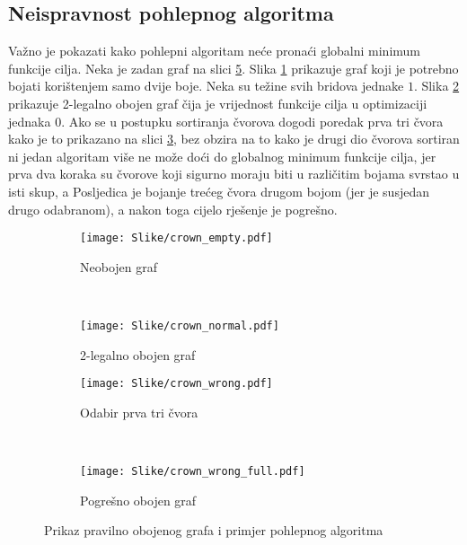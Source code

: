 \documentclass[times, utf8, diplomski, numeric]{fer}
\begin{document}
\subsection{Neispravnost pohlepnog algoritma}

Važno je pokazati kako pohlepni algoritam neće pronaći globalni minimum funkcije cilja. Neka je zadan graf na slici \ref{fig:greedy_alg}.
Slika \ref{fig:crown_empty} prikazuje graf koji je potrebno bojati korištenjem samo dvije boje. Neka su težine svih bridova jednake $1$. Slika \ref{fig:crown_normal} prikazuje 2-legalno obojen graf čija je vrijednost funkcije cilja u optimizaciji jednaka $0$. Ako se u postupku sortiranja čvorova dogodi poredak prva tri čvora kako je to prikazano na slici \ref{fig:crown_wrong}, bez obzira na to kako je drugi dio čvorova sortiran ni jedan algoritam više ne može doći do globalnog minimum funkcije cilja, jer prva dva koraka su čvorove koji sigurno moraju biti u različitim bojama svrstao u isti skup, a Posljedica je bojanje trećeg čvora drugom bojom (jer je susjedan drugo odabranom), a nakon toga cijelo rješenje je pogrešno.


\begin{figure}
        \centering
        \begin{subfigure}[b]{0.33\textwidth}
                \texttt{[image: Slike/crown\_empty.pdf]}
                \caption{Neobojen graf}
                \label{fig:crown_empty}
        \end{subfigure}
        ~
        \begin{subfigure}[b]{0.33\textwidth}
                \texttt{[image: Slike/crown\_normal.pdf]}
                \caption{2-legalno obojen graf}
                \label{fig:crown_normal}
        \end{subfigure}
         
        \begin{subfigure}[b]{0.33\textwidth}
                \texttt{[image: Slike/crown\_wrong.pdf]}
                \caption{Odabir prva tri čvora}
                \label{fig:crown_wrong}
        \end{subfigure}
        ~
        \begin{subfigure}[b]{0.33\textwidth}
                \texttt{[image: Slike/crown\_wrong\_full.pdf]}
                \caption{Pogrešno obojen graf}
                \label{fig:crown_wrong_full}
        \end{subfigure}
        \caption{Prikaz pravilno obojenog grafa i primjer pohlepnog algoritma}
        \label{fig:greedy_alg}
\end{figure}
\end{document}
